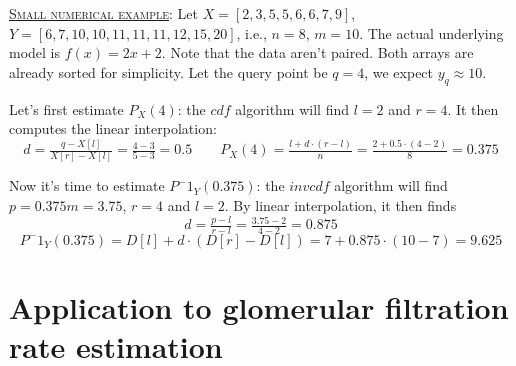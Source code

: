 \documentclass[10pt,final]{siamltex}
\begin{document}
\begin{tcolorbox}[colback=gray!30,%
  colframe=black,%
  width=\dimexpr\linewidth-2\fboxrule\relax,
  arc=3mm, auto outer arc,
  breakable
  ]
  \underline{\textsc{Small numerical example}}: Let $X=[2,3,5,5,6,6,7,9]$, $Y=[6,7,10,10,11,11,11,12,15,20]$, i.e., $n=8$, $m=10$. The actual underlying model is $f(x)=2x+2$. Note that the data aren't paired. Both arrays are already sorted for simplicity. Let the query point be $q=4$, we expect $y_q\approx10$.

Let's first estimate $P_X(4)$: the $cdf$ algorithm will find $l=2$ and $r=4$. It then computes the linear interpolation:
  \begin{equation*}
    d = \tfrac{q-X[l]}{X[r]-X[l]} = \tfrac{4-3}{5-3} = 0.5
    \quad\quad
    P_X(4)=\tfrac{l+d\cdot(r-l)}{n}=\tfrac{2+0.5\cdot(4-2)}{8}=0.375
  \end{equation*}

Now it's time to estimate $P^-1_Y(0.375)$: the $invcdf$ algorithm will find $p = 0.375  m=3.75$, $r=4$ and $l=2$. By linear interpolation, it then finds
    \begin{equation*}
      d = \tfrac{p-l}{r-l} = \tfrac{3.75-2}{4-2} = 0.875
    \end{equation*}
    \begin{equation*}
      P^-1_Y(0.375)=D[l]+d\cdot(D[r]-D[l])=7+0.875\cdot(10-7)=9.625
    \end{equation*}
\end{tcolorbox}
%
\section{Application to glomerular filtration rate estimation}\label{gfr}
\end{document}

